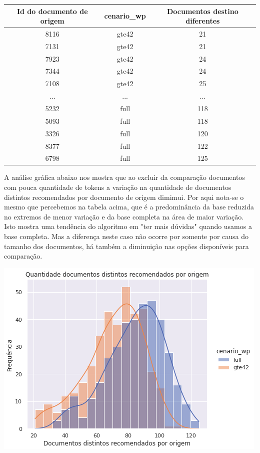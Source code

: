 \begin{center}
    \begin{tabular}{|c|c|c|}
        \hline
        \textbf{Id do documento de origem} & \textbf{cenario\_wp} & \textbf{Documentos destino diferentes} \\
        \hline
        8116 & gte42 & 21 \\
        \hline
        7131 & gte42 & 21 \\
        \hline
        7923 & gte42 & 24 \\
        \hline
        7344 & gte42 & 24 \\
        \hline
        7108 & gte42 & 25 \\
        \hline
        ... & ... & ... \\
        \hline
        5232 & full & 118 \\
        \hline
        5093 & full & 118 \\
        \hline
        3326 & full & 120 \\
        \hline
        8377 & full & 122 \\
        \hline
        6798 & full & 125 \\
        \hline
    \end{tabular}
\end{center}

A análise gráfica abaixo nos mostra que ao excluir da comparação documentos com pouca quantidade de tokens a variação na quantidade de documentos
distintos recomendados por documento de origem dimimui. Por aqui nota-se o mesmo que percebemos na tabela acima, que é a predominância da base reduzida
no extremos de menor variação e da base completa na área de maior variação. Isto mostra uma tendência do algoritmo em "ter mais dúvidas" quando usamos 
a base completa. Mas a diferença neste caso não ocorre por somente por causa do tamanho dos documentos, há também a diminuição nas opções disponíveis para
comparação.

\includegraphics[scale=0.7]{resultados/resources/distribuicao_semelhantes_distintos_cenario_wp.png}

